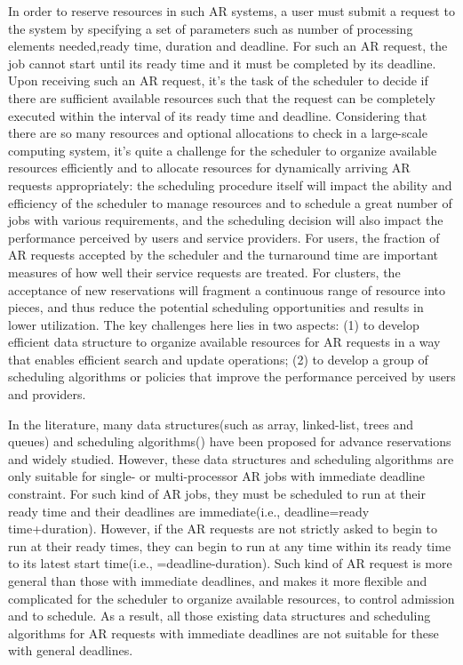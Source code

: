 \documentclass[preprint,12pt]{elsarticle}
\begin{document}
In order to reserve resources in such AR systems, a user must submit a request to the system by specifying a set of parameters such as number of processing elements needed,ready time, duration and deadline. For such an AR request, the job cannot start until its ready time and it must be completed by its deadline. Upon receiving such an AR request, it's the task of the scheduler to decide if there are sufficient available resources such that the request can be completely executed within the interval of its ready time and deadline. Considering that there are so many resources and optional allocations to check in a large-scale computing system, it's quite a challenge for the scheduler to organize available resources efficiently and to allocate resources for dynamically arriving AR requests appropriately: the scheduling procedure itself will impact the ability and efficiency of the scheduler to manage resources and to schedule a great number of jobs with various requirements, and the scheduling decision will also impact the performance perceived by users and service providers. For users, the fraction of AR requests accepted by the scheduler and the turnaround time are important measures of how well their service requests are treated\cite{li2007performance,snell2000performance}. For clusters, the acceptance of new reservations will fragment a continuous range of resource into pieces, and thus reduce the potential scheduling opportunities and results in lower utilization\cite{naiksatam2007elastic,margo2008impact}. The key challenges here lies in two aspects: (1) to develop efficient data structure to organize available resources for AR requests in a way that enables efficient search and update operations; (2) to develop a group of scheduling algorithms or policies that improve the performance perceived by users and providers.


In the literature, many data structures(such as array\cite{burchard2005analysis}, linked-list\cite{xiong2005linked},
trees\cite{wang2002bandwidth,burchard2005analysis,nie2010flexible} and queues\cite{brown1988calendar,Sulistio2009}) and scheduling algorithms(\cite{netto2010sla,naiksatam2007elastic,balakrishnan2010sla,nie2010flexible}) have been proposed for advance reservations and widely studied. However, these data structures and scheduling algorithms are only suitable for single- or multi-processor AR jobs with immediate deadline constraint. For such kind of AR jobs, they must be scheduled to run at their ready time and their deadlines are immediate(i.e., deadline=ready time+duration). However, if the AR requests are not strictly asked to begin to run at their ready times, they can begin to run at any time within its ready time to its latest start time(i.e., =deadline-duration). Such kind of AR request is more general than those with immediate deadlines, and makes it more flexible and complicated for the scheduler to organize available resources, to control admission and to schedule. As a result, all those existing data structures and scheduling algorithms for AR requests with immediate deadlines are not suitable for these with general deadlines.
\end{document}
